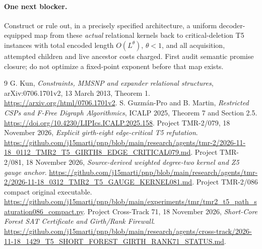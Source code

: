 \documentclass[11pt]{article}
\begin{document}
\paragraph{One next blocker.}
Construct or rule out, in a precisely specified architecture, a uniform
decoder-equipped map from these \emph{actual} relational kernels back to
critical-deletion T5 instances with total encoded length $O(L^\theta)$,
$\theta<1$, and all acquisition, attempted children and live ancestor costs
charged. First audit semantic promise closure; do not optimize a fixed-point
exponent before that map exists.

\begin{thebibliography}{9}
 G. Kun, \emph{Constraints, MMSNP and expander relational
structures}, arXiv:0706.1701v2, 13 March 2013, Theorem 1.
\url{https://arxiv.org/html/0706.1701v2}.
 S. Guzm\'an-Pro and B. Martin, \emph{Restricted CSPs and
F-Free Digraph Algorithmics}, ICALP 2025, Theorem 7 and Section 2.5.
\url{https://doi.org/10.4230/LIPIcs.ICALP.2025.158}.
 Project TMR-2/079, 18 November 2026,
\emph{Explicit girth-eight edge-critical T5 refutation}.
\url{https://github.com/j15marti/pnp/blob/main/research/agents/tmr-2/2026-11-18_0112_TMR2_T5_GIRTH8_EDGE_CRITICAL079.md}.
 Project TMR-2/081, 18 November 2026,
\emph{Source-derived weighted degree-two kernel and Z5 gauge anchor}.
\url{https://github.com/j15marti/pnp/blob/main/research/agents/tmr-2/2026-11-18_0312_TMR2_T5_GAUGE_KERNEL081.md}.
 Project TMR-2/086 compact original executable.
\url{https://github.com/j15marti/pnp/blob/main/experiments/tmr/tmr2_t5_path_saturation086_compact.py}.
 Project Cross-Track 71, 18 November 2026,
\emph{Short-Core Forest SAT Certificate and Girth/Rank Firewall}.
\url{https://github.com/j15marti/pnp/blob/main/research/agents/cross-track/2026-11-18_1429_T5_SHORT_FOREST_GIRTH_RANK71_STATUS.md}.
\end{thebibliography}
\end{document}
